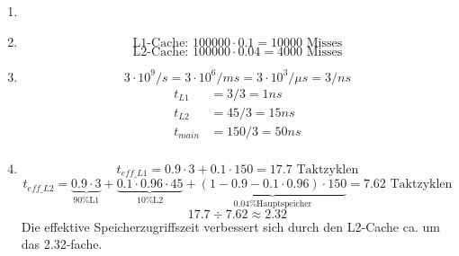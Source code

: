 \documentclass[a4paper, 12pt, margins=2cm]{homework}
\begin{document}
\begin{problem}
  
\end{problem}
\begin{solution}\hfill
  \begin{enumerate}[label=(\alph*)]\itemsep0pt
    \item \hfill \begin{center}
                    \def\svgwidth{0.95\textwidth}
                 \end{center}

    \item \hfill
      \[ \text{L1-Cache: } 100000\cdot 0.1 = 10000 \text{ Misses} \]
      \[ \text{L2-Cache: } 100000\cdot 0.04 = 4000 \text{ Misses} \]

    \item \hfill
    \[ 3\cdot 10^9/s = 3\cdot 10^6/ms = 3\cdot 10^3/\mu s = 3/ns \]
    \begin{align*}
      t_{L1} &= 3/3 = 1ns \\
      t_{L2} &= 45/3 = 15ns \\
      t_{main} &= 150/3 = 50ns \\
    \end{align*}

    \item \hfill
      \[ t_{eff\_L1} = 0.9\cdot 3 + 0.1\cdot 150 = 17.7 \text{ Taktzyklen} \]
      \[ t_{eff\_L2} = \underbrace{0.9\cdot 3}_\text{90\% L1} + \underbrace{0.1\cdot 0.96\cdot 45}_\text{10\% L2} + \underbrace{(1-0.9-0.1\cdot 0.96)\cdot 150}_\text{0.04\% Hauptspeicher} = 7.62 \text{ Taktzyklen} \]
      \[ 17.7\div 7.62 \approx 2.32 \]
      Die effektive Speicherzugriffszeit verbessert sich durch den L2-Cache ca.
      um das 2.32-fache.
  \end{enumerate}
    
\end{solution}
\end{document}
